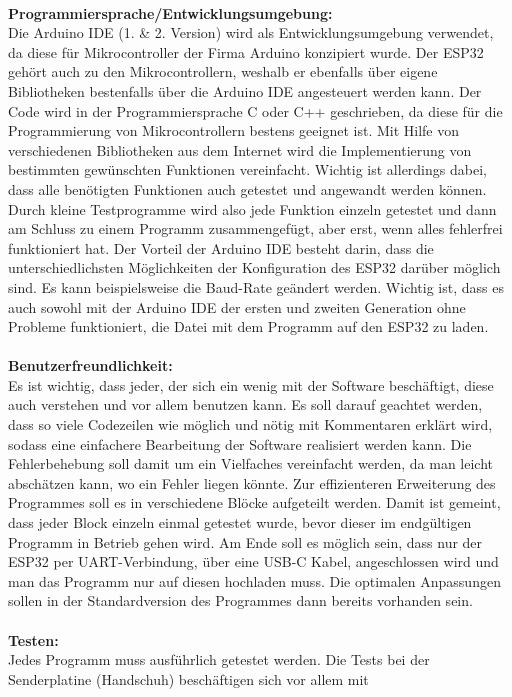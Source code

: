 \documentclass[11pt]{article}
\begin{document}
\\
\textbf{Programmiersprache/Entwicklungsumgebung:}
\\
Die Arduino IDE (1. \& 2. Version) wird als Entwicklungsumgebung verwendet, da diese für Mikrocontroller der Firma Arduino 
konzipiert wurde. Der ESP32 gehört auch zu den Mikrocontrollern, weshalb er ebenfalls über eigene Bibliotheken bestenfalls 
über die Arduino IDE angesteuert werden kann. Der Code wird in der Programmiersprache C oder C++ geschrieben, da diese für 
die Programmierung von Mikrocontrollern bestens geeignet ist. Mit Hilfe von verschiedenen Bibliotheken aus dem Internet wird 
die Implementierung von bestimmten gewünschten Funktionen vereinfacht. Wichtig ist allerdings dabei, dass alle benötigten 
Funktionen auch getestet und angewandt werden können. Durch kleine Testprogramme wird also jede Funktion einzeln getestet und 
dann am Schluss zu einem Programm zusammengefügt, aber erst, wenn alles fehlerfrei funktioniert hat. Der Vorteil der Arduino 
IDE besteht darin, dass die unterschiedlichsten Möglichkeiten der Konfiguration des ESP32 darüber möglich sind. Es kann 
beispielsweise die Baud-Rate geändert werden. Wichtig ist, dass es auch sowohl mit der Arduino IDE der ersten und zweiten 
Generation ohne Probleme funktioniert, die Datei mit dem Programm auf den ESP32 zu laden. \\
\\
\textbf{Benutzerfreundlichkeit:}
\\
Es ist wichtig, dass jeder, der sich ein wenig mit der Software beschäftigt, diese auch verstehen und vor allem benutzen kann. 
Es soll darauf geachtet werden, dass so viele Codezeilen wie möglich und nötig mit Kommentaren erklärt wird, sodass eine 
einfachere Bearbeitung der Software realisiert werden kann. Die Fehlerbehebung soll damit um ein Vielfaches vereinfacht werden, 
da man leicht abschätzen kann, wo ein Fehler liegen könnte. Zur effizienteren Erweiterung des Programmes soll es in 
verschiedene Blöcke aufgeteilt werden. Damit ist gemeint, dass jeder Block einzeln einmal getestet wurde, bevor dieser im 
endgültigen Programm in Betrieb gehen wird. Am Ende soll es möglich sein, dass nur der ESP32 per UART-Verbindung, über eine 
USB-C Kabel, angeschlossen wird und man das Programm nur auf diesen hochladen muss. Die optimalen Anpassungen sollen in der 
Standardversion des Programmes dann bereits vorhanden sein. \\
\\
\textbf{Testen:}
\\
Jedes Programm muss ausführlich getestet werden. Die Tests bei der Senderplatine (Handschuh) beschäftigen sich vor allem mit 
\end{document}
